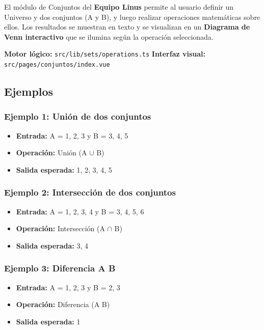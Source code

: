\documentclass[11pt,a4paper,openany]{book}
\begin{document}
El módulo de Conjuntos del \textbf{Equipo Linus} permite al usuario definir un Universo y dos conjuntos (A y B), y luego realizar operaciones matemáticas sobre ellos. Los resultados se muestran en texto y se visualizan en un \textbf{Diagrama de Venn interactivo} que se ilumina según la operación seleccionada.

\textbf{Motor lógico:} \texttt{src/lib/sets/operations.ts}
\textbf{Interfaz visual:} \texttt{src/pages/conjuntos/index.vue}

\hrulefill

\subsection{Ejemplos}

\subsubsection{Ejemplo 1: Unión de dos conjuntos}
\begin{itemize}[leftmargin=*]
\item \textbf{Entrada:} A = {1, 2, 3} y B = {3, 4, 5}
\item \textbf{Operación:} Unión (A $ \cup $ B)
\item \textbf{Salida esperada:} {1, 2, 3, 4, 5}
\end{itemize}

\subsubsection{Ejemplo 2: Intersección de dos conjuntos}
\begin{itemize}[leftmargin=*]
\item \textbf{Entrada:} A = {1, 2, 3, 4} y B = {3, 4, 5, 6}
\item \textbf{Operación:} Intersección (A $ \cap $ B)
\item \textbf{Salida esperada:} {3, 4}
\end{itemize}

\subsubsection{Ejemplo 3: Diferencia A  B}
\begin{itemize}[leftmargin=*]
\item \textbf{Entrada:} A = {1, 2, 3} y B = {2, 3}
\item \textbf{Operación:} Diferencia (A  B)
\item \textbf{Salida esperada:} {1}
\end{itemize}
\end{document}
